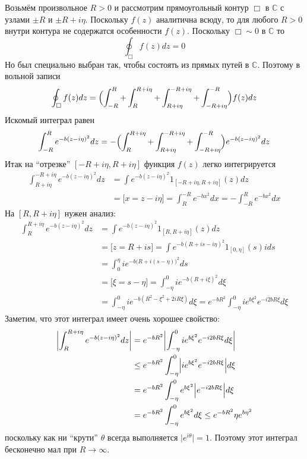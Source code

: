 \documentclass[a4paper]{article}
\newcommand{\abs}[1]{\lvert #1\rvert}
\newcommand{\Cplx}{\mathbb{C}}
\begin{document}
Возьмём произвольное $R>0$ и рассмотрим прямоугольный контур $\Box$ в $\Cplx$ с
узлами $\pm R$ и $\pm R+i\eta$. Поскольку $f(z)$ аналитична всюду, то для любого
$R>0$ внутри контура не содержатся особенности $f(z)$. Поскольку $\Box\sim 0$ в
$\Cplx$ то
\[\oint_\Box f(z) dz = 0\]
Но был специально выбран так, чтобы состоять из прямых путей в $\Cplx$. Поэтому
в вольной записи
\[
\oint_\Box f(z) dz
= \Bigl( \int_{-R}^R + \int_R^{R+i\eta} + \int_{R+i\eta}^{-R+i\eta} + \int_{-R+i\eta}^{-R} \Bigr) f(z) dz
\]
Искомый интеграл равен
\[\int_{-R}^R e^{-b (z - i\eta)^2} dz
= - \Bigl(\int_R^{R+i\eta} + \int_{R+i\eta}^{-R+i\eta} + \int_{-R+i\eta}^{-R} \Bigr) e^{-b (z - i\eta)^2} dz\]
Итак на ``отрезке'' $[-R+i\eta,R+i\eta]$ функция $f(z)$ легко интегрируется
\begin{align*}
	\int_{R+i\eta}^{-R+i\eta} e^{-b (z - i\eta)^2} dz
	&= \int e^{-b (z - i\eta)^2} 1_{[-R+i\eta,R+i\eta]}(z) dz\\
	&= \bigl[x = z-i\eta\bigr] = \int_R^{-R} e^{-b x^2} dx = -\int_{-R}^R e^{-b x^2} dx
\end{align*}
На $[R,R+i\eta]$ нужен анализ: 
\begin{align*}
	\int_R^{R+i\eta} e^{-b (z - i\eta)^2} dz
	&= \int e^{-b (z - i\eta)^2} 1_{[R,R+i\eta]}(z) dz\\
	&= \bigl[z = R+is \bigr] = \int e^{-b (R + is - i\eta)^2} 1_{[0,\eta]}(s) ids\\
	&= \int_0^\eta i e^{-b \bigr(R + i(s - \eta)\bigl)^2} ds\\
	&= \bigl[\xi = s-\eta \bigr] = \int_{-\eta}^0 i e^{-b(R + i\xi)^2} d\xi\\
	&= \int_{-\eta}^0 i e^{-b (R^2 - \xi^2 + 2 i R\xi)} d\xi
	= e^{-bR^2} \int_{-\eta}^0 i e^{b\xi^2} e^{- i 2bR\xi} d\xi
\end{align*}
Заметим, что этот интеграл имеет очень хорошее свойство:
\begin{align*}
	\biggl\lvert \int_R^{R+i\eta} e^{-b (z - i\eta)^2} dz \biggr\rvert
	&= e^{-bR^2} \biggl\lvert \int_{-\eta}^0 i e^{b\xi^2} e^{- i 2bR\xi} d\xi \biggr \rvert\\
	&\leq e^{-bR^2} \int_{-\eta}^0 \Bigl\lvert i e^{b\xi^2} e^{- i 2bR\xi} \Bigr\rvert d\xi\\
	&= e^{-bR^2} \int_{-\eta}^0 e^{b\xi^2} \Bigl\lvert e^{- i 2bR\xi} \Bigr\rvert d\xi\\
	&= e^{-bR^2} \int_{-\eta}^0 e^{b\xi^2} d\xi \leq e^{-bR^2} \eta e^{b\eta^2}
\end{align*}
поскольку как ни ``крути'' $\theta$ всегда выполняется $\abs{e^{i\theta}} = 1$.
Поэтому этот интеграл бесконечно мал при $R\to\infty$.
\end{document}
